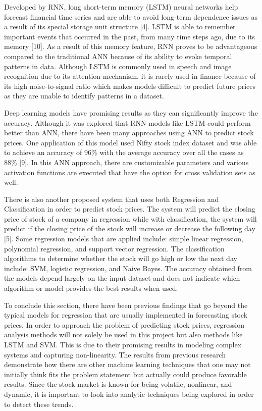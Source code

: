\documentclass[12pt,a4paper]{article}
\begin{document}
Developed by RNN, long short-term memory (LSTM) neural networks help forecast financial time series and are able to avoid long-term dependence issues as a result of its special storage unit structure [4]. LSTM is able to remember important events that occurred in the past, from many time steps ago, due to its memory [10]. As a result of this memory feature, RNN proves to be advantageous compared to the traditional ANN because of its ability to evoke temporal patterns in data. Although LSTM is commonly used in speech and image recognition due to its attention mechanism, it is rarely used in finance because of its high noise-to-signal ratio which makes models difficult to predict future prices as they are unable to identify patterns in a dataset. 

Deep learning models have promising results as they can significantly improve the accuracy. Although it was explored that RNN models like LSTM could perform better than ANN, there have been many approaches using ANN to predict stock prices. One application of this model used Nifty stock index dataset and was able to achieve an accuracy of 96\% with the average accuracy over all the cases as 88\% [9]. In this ANN approach, there are customizable parameters and various activation functions are executed that have the option for cross validation sets as well. 

There is also another proposed system that uses both Regression and Classification in order to predict stock prices. The system will predict the closing price of stock of a company in regression while with classification, the system will predict if the closing price of the stock will increase or decrease the following day [5]. Some regression models that are applied include: simple linear regression, polynomial regression, and support vector regression. The classification algorithms to determine whether the stock will go high or low the next day include: SVM, logistic regression, and Naive Bayes. The accuracy obtained from the models depend largely on the input dataset and does not indicate which algorithm or model provides the best results when used. 

To conclude this section, there have been previous findings that go beyond the typical models for regression that are usually implemented in forecasting stock prices. In order to approach the problem of predicting stock prices, regression analysis methods will not solely be used in this project but also methods like LSTM and SVM. This is due to their promising results in modeling complex systems and capturing non-linearity. The results from previous research demonstrate how there are other machine learning techniques that one may not initially think fits the problem statement but actually could produce favorable results. Since the stock market is known for being volatile, nonlinear, and dynamic, it is important to look into analytic techniques being explored in order to detect these trends.
\end{document}
